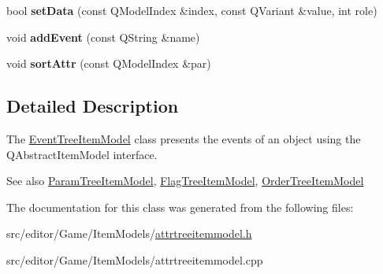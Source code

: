 \begin{DoxyCompactItemize}
\item 
\hypertarget{class_event_tree_item_model_a43b2b85a738c0132506d956dcd27da38}{bool {\bfseries set\-Data} (const \-Q\-Model\-Index \&index, const \-Q\-Variant \&value, int role)}\label{class_event_tree_item_model_a43b2b85a738c0132506d956dcd27da38}

\item 
\hypertarget{class_event_tree_item_model_aa77a7662d999216a3c14f5a7be3a09ba}{void {\bfseries add\-Event} (const \-Q\-String \&name)}\label{class_event_tree_item_model_aa77a7662d999216a3c14f5a7be3a09ba}

\item 
\hypertarget{class_event_tree_item_model_a42364afd8f2f60f4952cb0abddf9cb5f}{void {\bfseries sort\-Attr} (const \-Q\-Model\-Index \&par)}\label{class_event_tree_item_model_a42364afd8f2f60f4952cb0abddf9cb5f}

\end{DoxyCompactItemize}


\subsection{\-Detailed \-Description}
\-The \hyperlink{class_event_tree_item_model}{\-Event\-Tree\-Item\-Model} class presents the events of an object using the \-Q\-Abstract\-Item\-Model interface. 

\begin{DoxySeeAlso}{\-See also}
\hyperlink{class_param_tree_item_model}{\-Param\-Tree\-Item\-Model}, \hyperlink{class_flag_tree_item_model}{\-Flag\-Tree\-Item\-Model}, \hyperlink{class_order_tree_item_model}{\-Order\-Tree\-Item\-Model} 
\end{DoxySeeAlso}


\-The documentation for this class was generated from the following files\-:\begin{DoxyCompactItemize}
\item 
src/editor/\-Game/\-Item\-Models/\hyperlink{attrtreeitemmodel_8h}{attrtreeitemmodel.\-h}\item 
src/editor/\-Game/\-Item\-Models/attrtreeitemmodel.\-cpp\end{DoxyCompactItemize}
